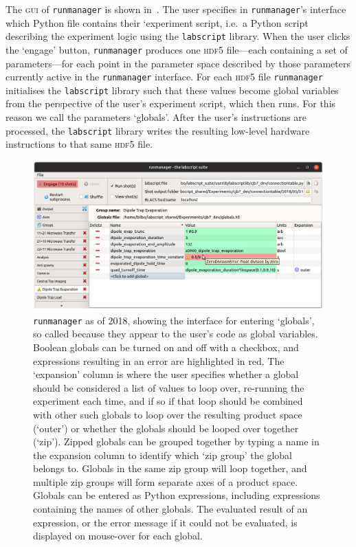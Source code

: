 The \textsc{gui} of \texttt{runmanager} is shown in~. The user specifies in \texttt{runmanager}'s interface which Python file contains their `experiment script, i.e.~a Python script describing the experiment logic using the \texttt{labscript} library. When the user clicks the `engage' button, \texttt{runmanager} produces one \textsc{hdf5} file---each containing a set of parameters---for each point in the parameter space described by those parameters currently active in the \texttt{runmanager} interface. For each \textsc{hdf5} file \texttt{runmanager} initialises the \texttt{labscript} library such that these values become global variables from the perspective of the user's experiment script, which then runs. For this reason we call the parameters `globals'. After the user's instructions are processed, the \texttt{labscript} library writes the resulting low-level hardware instructions to that same \textsc{hdf5} file.

\begin{figure}[t]
\begin{center}
\includegraphics[width=\textwidth]{figures/software/new_screenshots/runmanager.png}
\caption{\texttt{runmanager} as of 2018, showing the interface for entering `globals', so called because they appear to the user's code as global variables. Boolean globals can be turned on and off with a checkbox, and expressions resulting in an error are highlighted in red. The `expansion' column is where the user specifies whether a global should be considered a list of values to loop over, re-running the experiment each time, and if so if that loop should be combined with other such globals to loop over the resulting product space (`outer') or whether the globals should be looped over together (`zip'\protect\footnotemark). Zipped globals can be grouped together by typing a name in the expansion column to identify which `zip group' the global belongs to. Globals in the same zip group will loop together, and multiple zip groups will form separate axes of a product space. Globals can be entered as Python expressions, including expressions containing the names of other globals. The evaluated result of an expression, or the error message if it could not be evaluated, is displayed on mouse-over for each global.}\label{fig:runmanager}
\end{center}
\end{figure}

